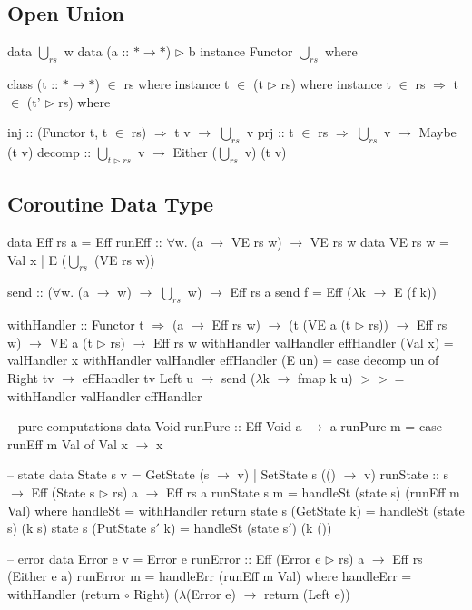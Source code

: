 \documentclass{article}
\newcommand{\hbind}{>\!\!\!>\!\!\!=}
\newcommand{\U}{\bigcup\nolimits}
\begin{document}
\subsection*{Open Union}
\begin{code}
data $\U_{rs}$ w
data (a :: $* \to *$) $\rhd$ b
instance Functor  $\U_{rs}$ where

class (t :: $* \to *$) $\in$ rs where
instance t $\in$ (t $\rhd$ rs) where
instance t $\in$ rs $\Rightarrow$ t $\in$ (t' $\rhd$ rs) where

inj :: (Functor t, t $\in$ rs) $\Rightarrow$ t v $\to$ $\U_{rs}$ v
prj :: t $\in$ rs $\Rightarrow$ $\U_{rs}$ v $\to$ Maybe (t v)
decomp :: $\U_{t \rhd rs}$ v $\to$ Either ($\U_{rs}$ v) (t v)
\end{code}

\newpage
\subsection*{Coroutine Data Type}
\begin{code}
data Eff rs a = Eff { runEff :: $\forall$w. (a $\to$ VE rs w) $\to$ VE rs w }
data VE rs w = Val x
                     | E ($\U_{rs}$ (VE rs w))

send :: ($\forall$w. (a $\to$ w) $\to$ $\U_{rs}$ w) $\to$ Eff rs a
send f = Eff ($\lambda$k $\to$ E (f k))

withHandler :: Functor t
                $\Rightarrow$ (a $\to$ Eff rs w)
                $\to$ (t (VE a (t $\rhd$ rs)) $\to$ Eff rs w)
                $\to$ VE a (t $\rhd$ rs)
                $\to$ Eff rs w
withHandler valHandler effHandler (Val x) = valHandler x
withHandler valHandler effHandler (E un) = case decomp un of
    Right tv $\to$ effHandler tv
    Left u $\to$ send ($\lambda$k $\to$ fmap k u) $\hbind$ withHandler valHandler effHandler

-- pure computations
data Void
runPure :: Eff Void a $\to$ a
runPure m = case runEff m Val of
  Val x $\to$ x

-- state
data State s v = GetState (s $\to$ v)
                     | SetState s (() $\to$ v)
runState :: s $\to$ Eff (State s $\rhd$ rs) a $\to$ Eff rs a
runState s m = handleSt (state s) (runEff m Val) where
    handleSt = withHandler return
    state s (GetState k) = handleSt (state s) (k s)
    state s (PutState s$'$ k) = handleSt (state s$'$) (k ())

-- error
data Error e v = Error e
runError :: Eff (Error e $\rhd$ rs) a $\to$ Eff rs (Either e a)
runError m = handleErr (runEff m Val) where
    handleErr = withHandler (return $\circ$ Right) ($\lambda$(Error e) $\to$ return (Left e))
\end{code}
\end{document}
